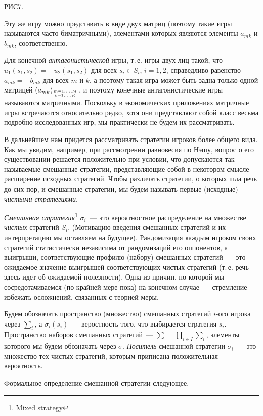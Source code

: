 РИС7.

Эту же игру можно представить в виде двух матриц (поэтому такие игры
называются часто  биматричными), элементами которых являются
элементы $a_{mk}$ и $b_{mk}$, соответственно.

Для конечной {\it антагонистической} игры, т.\,е. игры двух лиц
такой, что $u_1(s_1,s_2)=-u_2(s_1,s_2)$ для всех $s_i\in S_i$,
$i=1,2$, справедливо равенство $a_{mk}=-b_{mk}$ для всех $m$ и $k$,
а поэтому такая игра может быть  задна только одной матрицей
$(a_{mk})_{m=1,\ldots,M\atop{k=1,\ldots,K}}$, и поэтому конечные
антагонистические игры называются матричными. Поскольку в
экономических приложениях матричные игры встречаются относительно
редко, хотя они представляют собой класс весьма подробно
исследованных игр, мы практически не будем их рассматривать.


В дальнейшем нам придется рассматривать стратегии игроков более
общего вида. Как мы увидим, например, при рассмотрении равновесия
по Нэшу, вопрос о его существовании решается положительно при
условии, что допускаются так называемые смешанные стратегии,
представляющие собой в некотором смысле расширение исходных
стратегий. Чтобы различать стратегии, о которых шла речь до сих
пор, и смешанные стратегии, мы будем называть первые (исходные)
\emph{чистыми стратегиями}.

{\it Смешанная стратегия}\footnote{Mixed strategy} $\sigma_i$~---
это вероятностное распределение на множестве {\it чистых} стратегий
$S_i$. (Мотивацию введения смешанных стратегий и их интерпретацию мы
оставляем на будущее). Рандомизация каждым  игроком своих стратегий
статистически независима от рандомизаций его оппонентов, а выигрыши,
соответствующие профилю (набору) смешанных стратегий~--- это
ожидаемое значение выигрышей соответствующих чистых стратегий
(т.\,е. речь здесь идет об ожидаемой полезности). Одна из причин, по
которой мы сосредотачиваемся (по крайней мере пока) на конечном
случае~--- стремление избежать осложнений, связанных с теорией меры.

Будем обозначать пространство (множество) смешанных стратегий
$i$-ого игрока через $\sum_i$, а $\sigma_i(s_i)$~--- веростность
того, что выбирается стратегия $s_i$. Пространство наборов
смешанных стратегий~--- $\sum=\prod_{i\in I}\sum_i$, элементы
которого мы будем обозначать через $\sigma$. {\it Носитель}
смешанной стратегии $\sigma_i$~--- это множество тех чистых
стратегий, которым приписана положительная вероятность.

Формальное определение смешанной стратегии следующее.

